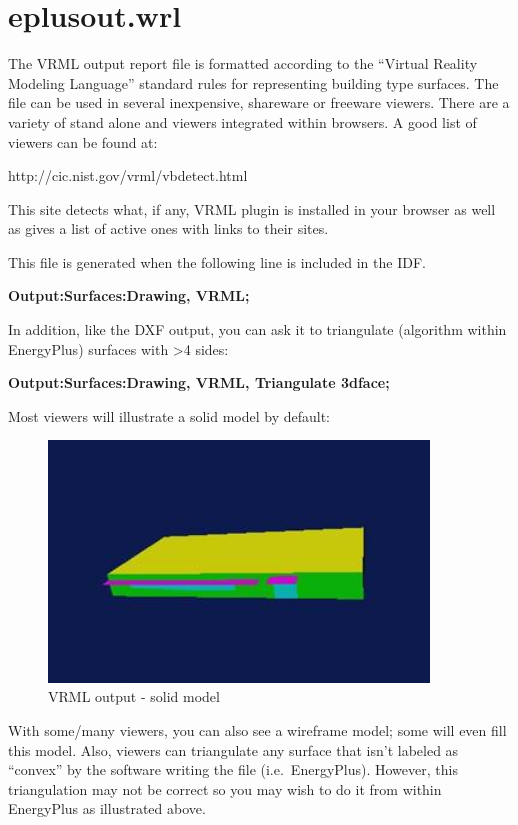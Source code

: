 \section{eplusout.wrl}\label{eplusout.wrl}

The VRML output report file is formatted according to the ``Virtual Reality Modeling Language'' standard rules for representing building type surfaces. The file can be used in several inexpensive, shareware or freeware viewers. There are a variety of stand alone and viewers integrated within browsers. A good list of viewers can be found at:

http://cic.nist.gov/vrml/vbdetect.html

This site detects what, if any, VRML plugin is installed in your browser as well as gives a list of active ones with links to their sites.

This file is generated when the following line is included in the IDF.

\textbf{Output:Surfaces:Drawing, VRML;}

In addition, like the DXF output, you can ask it to triangulate (algorithm within EnergyPlus) surfaces with \textgreater{}4 sides:

\textbf{Output:Surfaces:Drawing, VRML, Triangulate 3dface;}

Most viewers will illustrate a solid model by default:

\begin{figure}[hbtp] %
\centering
\includegraphics[width=0.9\textwidth, height=0.9\textheight, keepaspectratio=true]{media/image025.jpg}
\caption{VRML output - solid model \protect \label{fig:vrml-output-solid-model}}
\end{figure}

With some/many viewers, you can also see a wireframe model; some will even fill this model. Also, viewers can triangulate any surface that isn't labeled as ``convex'' by the software writing the file (i.e.~EnergyPlus). However, this triangulation may not be correct so you may wish to do it from within EnergyPlus as illustrated above.

